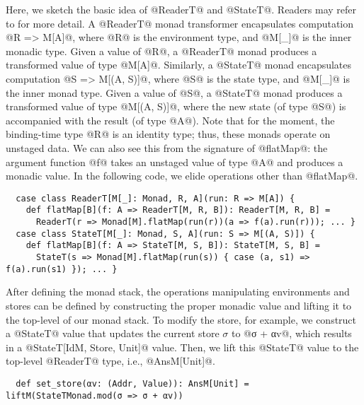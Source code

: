 Here, we sketch the basic idea of @ReaderT@ and @StateT@. Readers may
refer to \cite{DBLP:conf/popl/LiangHJ95, Chiusano:2014:FPS:2688794} for more detail.
A @ReaderT@ monad transformer encapsulates computation @R => M[A]@, where
@R@ is the environment type, and @M[_]@ is the inner monadic type.
Given a value of @R@, a @ReaderT@ monad produces a transformed value of type @M[A]@.
Similarly, a @StateT@ monad encapsulates computation @S => M[(A, S)]@, where
@S@ is the state type, and @M[_]@ is the inner monad type.
Given a value of @S@, a @StateT@ monad produces a transformed value of type @M[(A, S)]@,
where the new state (of type @S@) is accompanied with the result (of type @A@).
Note that for the moment, the binding-time type @R@ is an identity type; thus,
these monads operate on unstaged data. We can also see this from the
signature of @flatMap@: the argument function @f@ takes an unstaged value of type @A@ and
produces a monadic value. In the following code, we elide operations other than @flatMap@.
\begin{lstlisting}
  case class ReaderT[M[_]: Monad, R, A](run: R => M[A]) {
    def flatMap[B](f: A => ReaderT[M, R, B]): ReaderT[M, R, B] =
      ReaderT(r => Monad[M].flatMap(run(r))(a => f(a).run(r))); ... }
  case class StateT[M[_]: Monad, S, A](run: S => M[(A, S)]) {
    def flatMap[B](f: A => StateT[M, S, B]): StateT[M, S, B] =
      StateT(s => Monad[M].flatMap(run(s)) { case (a, s1) => f(a).run(s1) }); ... }
\end{lstlisting}

After defining the monad stack, the operations manipulating environments
and stores can be defined by constructing the proper monadic value and lifting it to the
top-level of our monad stack. To modify the store, for example, we construct a
@StateT@ value that updates the current store $\sigma$ to @σ + αv@, which
results in a @StateT[IdM, Store, Unit]@ value. Then, we lift this @StateT@
value to the top-level @ReaderT@ type, i.e., @AnsM[Unit]@.
\begin{lstlisting}
  def set_store(αv: (Addr, Value)): AnsM[Unit] = liftM(StateTMonad.mod(σ => σ + αv))
\end{lstlisting}

